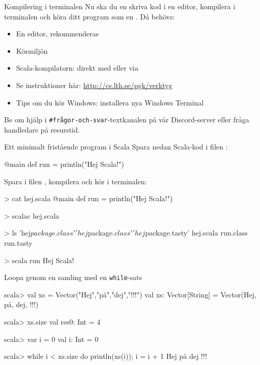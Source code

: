
\ifkompendium\else
\begin{SlideExtra}{Kompilering i terminalen}
  Nu ska du en skriva kod i en editor, kompilera i terminalen och köra ditt program som en . Då behövs:
  \begin{itemize}
    \item En editor,  rekommenderas
    \item Körmiljön  
    \item Scala-kompilatorn: direkt med  eller via 
    \item Se instruktioner här: \url{http://cs.lth.se/pgk/verktyg}
    \item Tips om du kör Windows: installera %
    {nya Windows Terminal}

  \end{itemize}
    Be om hjälp i \texttt{\#frågor-och-svar}-textkanalen på vår Discord-server eller fråga handledare på resurstid.
  
\end{SlideExtra}
\fi

\begin{Slide}{Ett minimalt fristående program i Scala}\SlideFontSmall
Spara nedan Scala-kod i filen :
\begin{Code}
@main def run = println("Hej Scala!")
\end{Code}

Spara i filen , kompilera och kör i terminalen:
\begin{REPL}
> cat hej.scala
@main def run = println("Hej Scala!")

> scalac hej.scala

> ls
'hej$package.class'  'hej$package$.class'  'hej$package.tasty'   
hej.scala   run.class   run.tasty

> scala run 
Hej Scala! 
\end{REPL}

\end{Slide}


\begin{Slide}{Loopa genom en samling med en \texttt{while}-sats}
\begin{REPLnonum}
scala> val xs = Vector("Hej","på","dej","!!!")
val xs: Vector[String] =
  Vector(Hej, på, dej, !!!)

scala> xs.size
val res0: Int = 4

scala> var i = 0
val i: Int = 0

scala> while i < xs.size do { println(xs(i)); i = i + 1 }
Hej
på
dej
!!!
\end{REPLnonum}
\end{Slide}



